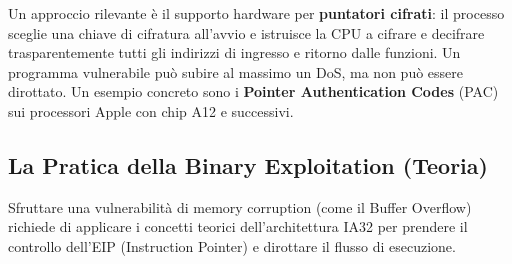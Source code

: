 \documentclass[12pt, a4paper]{report}
\begin{document}
Un approccio rilevante è il supporto hardware per \textbf{puntatori cifrati}: il processo sceglie una chiave di cifratura all'avvio e istruisce la CPU a cifrare e decifrare trasparentemente tutti gli indirizzi di ingresso e ritorno dalle funzioni. Un programma vulnerabile può subire al massimo un DoS, ma non può essere dirottato. Un esempio concreto sono i \textbf{Pointer Authentication Codes} (PAC) sui processori Apple con chip A12 e successivi.

\subsection{La Pratica della Binary Exploitation (Teoria)}
Sfruttare una vulnerabilità di memory corruption (come il Buffer Overflow) richiede di applicare i concetti teorici dell'architettura IA32 per prendere il controllo dell'EIP (Instruction Pointer) e dirottare il flusso di esecuzione.
\end{document}
